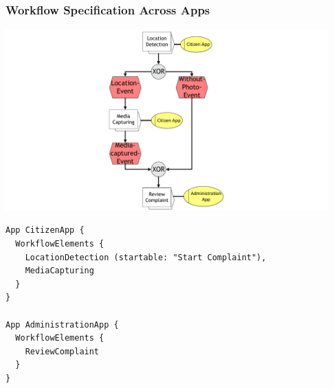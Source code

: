 \begin{frame}
	\plainnumber
	\frametitle{Workflow Specification Across Apps}
	
	\begin{minipage}{0.45\textwidth}
	    		        \includegraphics[height = 7cm, trim = 10cm 0cm 10cm 0cm, clip = true]{images/wfAcrossApps}	  
	\end{minipage}\hfill
	\begin{minipage}{0.5\textwidth}
\begin{lstlisting}
App CitizenApp {
  WorkflowElements {
    LocationDetection (startable: "Start Complaint"),
    MediaCapturing
  }
}

App AdministrationApp {
  WorkflowElements {
    ReviewComplaint
  }
}
\end{lstlisting}
\end{minipage}

\end{frame}


